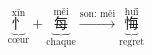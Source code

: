 {\Large \[ \underbrace{\overset{\text{xīn}}{\text{忄}}}_{\text{cœur}} + \underbrace{\overset{\text{měi}}{\text{每}}}_{\text{chaque}} \xrightarrow{\text{son: měi}} \underbrace{\overset{\text{huǐ}}{\text{悔}}}_{\text{regret}} \]}
